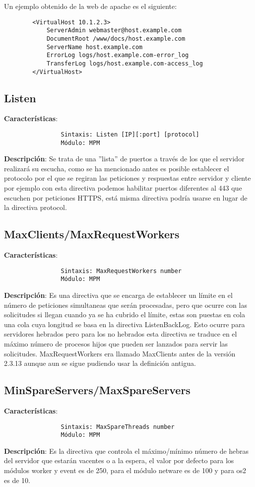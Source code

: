 \documentclass[a4paper, 11pt]{article} %
\begin{document}
	Un ejemplo obtenido de la web de apache \cite{url4} es el siguiente:
	\begin{verbatim}
		<VirtualHost 10.1.2.3>
			ServerAdmin webmaster@host.example.com
			DocumentRoot /www/docs/host.example.com
			ServerName host.example.com
			ErrorLog logs/host.example.com-error_log
			TransferLog logs/host.example.com-access_log
		</VirtualHost>
	\end{verbatim}
	\subsection{Listen}
	\textbf{Características}:
	\begin{verbatim}
				Sintaxis: Listen [IP][:port] [protocol]
				Módulo: MPM
	\end{verbatim}
	\textbf{Descripción}: Se trata de una ''lista'' de puertos a través de los que el servidor realizará su escucha, como se ha mencionado antes es posible establecer el protocolo por el que se regiran las peticiones y respuestas entre servidor y cliente por ejemplo con esta directiva podemos habilitar puertos diferentes al 443 que escuchen por peticiones HTTPS, está misma directiva podría usarse en lugar de la directiva protocol.
	\subsection{MaxClients/MaxRequestWorkers}
	\textbf{Características}:
	\begin{verbatim}
				Sintaxis: MaxRequestWorkers number
				Módulo: MPM
	\end{verbatim}
	\textbf{Descripción}: Es una directiva que se encarga de establecer un límite en el número de peticiones simultaneas que serán procesadas, pero que ocurre con las solicitudes si llegan cuando ya se ha cubrido el límite, estas son puestas en cola una cola cuya longitud se basa en la directiva ListenBackLog. Esto ocurre para servidores hebrados pero para los no hebrados esta directiva se traduce en el máximo número de procesos hijos que pueden ser lanzados para servir las solicitudes. MaxRequestWorkers era llamado MaxClients antes de la versión 2.3.13 aunque aun se sigue pudiendo usar la definición antigua.
	\subsection{MinSpareServers/MaxSpareServers}
	\textbf{Características}:
	\begin{verbatim}
				Sintaxis: MaxSpareThreads number
				Módulo: MPM
	\end{verbatim}
	\textbf{Descripción}: Es la directiva que controla el máximo/mínimo número de hebras del servidor que estarán vacentes o a la espera, el valor por defecto para los módulos worker y event es de 250, para el módulo netware es de 100 y para os2 es de 10.
\end{document}

